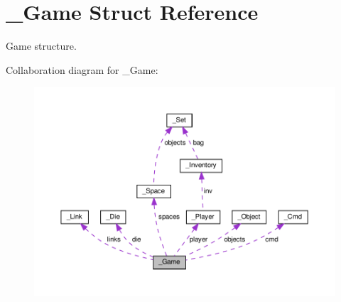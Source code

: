 \hypertarget{struct__Game}{}\section{\+\_\+\+Game Struct Reference}
\label{struct__Game}


Game structure.  




Collaboration diagram for \+\_\+\+Game\+:\nopagebreak
\begin{figure}[H]
\begin{center}
\leavevmode
\includegraphics[width=350pt]{struct__Game__coll__graph}
\end{center}
\end{figure}
